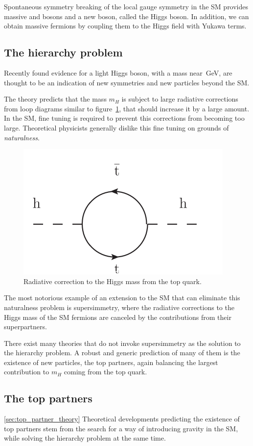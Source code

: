 Spontaneous symmetry breaking of the local gauge symmetry in the SM provides massive
\W and \Z bosons and a new boson, called the Higgs boson.
In addition, we can obtain massive fermions by coupling them to the Higgs
field with Yukawa terms.

\subsection{The hierarchy problem}
Recently found evidence for a light Higgs boson, with a mass
near~\unit[125]{GeV}, are thought to be an indication of new symmetries and
new particles beyond the SM.

The theory predicts that the mass $m_H$ is subject to large radiative
corrections from loop diagrams similar to figure~\ref{fig:higgs_correction},
that should increase it by a large amount.
In the SM, fine tuning is required to prevent this corrections from becoming
too large. Theoretical physicists generally dislike this fine tuning on grounds of
\emph{naturalness}.

\begin{figure}[htb]
    \centering
    \includegraphics[width=.4\textwidth]{images/pdf/higgs_correction}
    \caption{Radiative correction to the Higgs mass from the top quark.}
    \label{fig:higgs_correction}
\end{figure}

The most notorious example of an extension to the SM that can eliminate this
naturalness problem is supersimmetry, where the radiative corrections to
the Higgs mass of the SM fermions are canceled by the contributions from
their superpartners.

There exist many theories that do not invoke supersimmetry as the solution
to the hierarchy problem. A robust and generic prediction of many of them is the
existence of new particles, the top partners, again balancing the
largest contribution to $m_H$ coming from the top quark.

\subsection{The top partners}\ref{sec:top_partner_theory}
Theoretical developments predicting the existence of top partners stem from
the search for a way of introducing gravity in the SM, while solving the
hierarchy problem at the same time.

